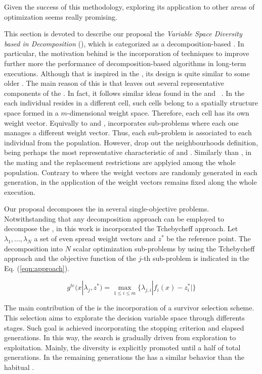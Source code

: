 
Given the success of this methodology, exploring its application to other areas of optimization seems really promising.


This section is devoted to describe our proposal the \textit{Variable Space Diversity \MOEA{} based in Decomposition} (\VSDMOEAD{}), which is categorized as a decomposition-based \MOEA{}.
%
In particular, the motivation behind \VSDMOEAD{} is the incorporation of techniques to improve further more the performance of decomposition-based algorithms in long-term executions.
%
Although that \VSDMOEAD{} is inspired in the \MOEAD{}, its design is quite similar to some older \MOEAS{}.
%
The main reason of this is that \VSDMOEAD{} leaves out several representative components of the \MOEAD{}.
%
In fact, it follows similar ideas found in the \MOGA{} and \CMOGA{}~\cite{murata2002cellular}.
%
In the \CMOGA{} each individual resides in a different cell, such cells belong to a spatially structure space formed in a $m$-dimensional weight space.
%
Therefore, each cell has its own weight vector.
%
Equivally to \MOEAD{} and \CMOGA{}, \VSDMOEAD{} incorporates sub-problems where each one manages a different weight vector.
%
Thus, each sub-problem is associated to each individual from the population.
%
However, \VSDMOEAD{} drop out the neighbourhoods definition, being perhaps the most representative characteristic of \CMOGA{} and \MOEAD{}.
%
Similarly than \MOGA{}, in \VSDMOEAD{} the mating and the replacement restrictions are applyied among the whole population.
%
Contrary to \MOGA{} where the weight vectors are randomly generated in each generation, in \VSDMOEAD{} the application of the weight vectors remains fixed along the whole execution.
%

Our proposal decomposes the \MOP{} in several single-objective problems.
%
Notwithstanding that any decomposition approach can be employed to decompose the \MOP{}, in this work is incorporated the Tchebycheff approach.
%
Let $\lambda_1, ..., \lambda_N$ a set of even spread weight vectors and $z^*$ be the reference point.
%
The decomposition into $N$ scalar optimization sub-problems by using the Tchebycheff approach and the objective function of the $j$-th sub-problem is indicated in the Eq. (\ref{eqn:approach}).
%

\begin{equation}\label{eqn:approach}
\displaystyle{
g^{te}(x| \lambda_j, z^*) = \max_{ 1 \leq i \leq m} \{ \lambda_{j,i} | f_i(x) - z_i^*|\}
}
\end{equation}


The main contribution of the \VSDMOEAD{} is the incorporation of a survivor selection scheme.
%
This selection aims to explorate the decision variable space through differents stages.
%
Such goal is achieved incorporating the stopping criterion and elapsed generations.
%
In this way, the search is gradually driven from exploration to exploitation.
%
Mainly, the diversity is explicitly promoted until a half of total generations. 
%
In the remaining generations the \VSDMOEAD{} has a similar behavior than the habitual \MOEAS{}.
%

